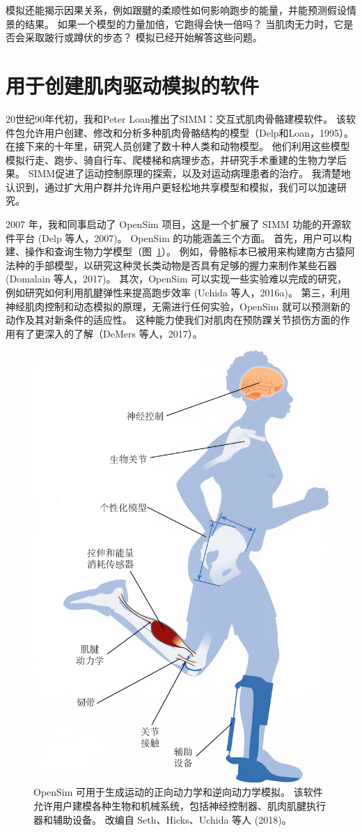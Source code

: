 模拟还能揭示因果关系，例如跟腱的柔顺性如何影响跑步的能量，并能预测假设情景的结果。
如果一个模型的力量加倍，它跑得会快一倍吗？
当肌肉无力时，它是否会采取跛行或蹲伏的步态？
模拟已经开始解答这些问题。



\section{用于创建肌肉驱动模拟的软件}

20世纪90年代初，我和Peter Loan推出了SIMM：交互式肌肉骨骼建模软件。
该软件包允许用户创建、修改和分析多种肌肉骨骼结构的模型（Delp和Loan，1995）。
在接下来的十年里，研究人员创建了数十种人类和动物模型。
他们利用这些模型模拟行走、跑步、骑自行车、爬楼梯和病理步态，并研究手术重建的生物力学后果。
SIMM促进了运动控制原理的探索，以及对运动病理患者的治疗。
我清楚地认识到，通过扩大用户群并允许用户更轻松地共享模型和模拟，我们可以加速研究。


2007 年，我和同事启动了 OpenSim 项目，这是一个扩展了 SIMM 功能的开源软件平台 (Delp 等人，2007)。
OpenSim 的功能涵盖三个方面。
首先，用户可以构建、操作和查询生物力学模型（图~\ref{fig:10_14}）。
例如，骨骼标本已被用来构建南方古猿阿法种的手部模型，以研究这种灵长类动物是否具有足够的握力来制作某些石器 (Domalain 等人，2017)。
其次，OpenSim 可以实现一些实验难以完成的研究，例如研究如何利用肌腱弹性来提高跑步效率 (Uchida 等人，2016a)。
第三，利用神经肌肉控制和动态模拟的原理，无需进行任何实验，OpenSim 就可以预测新的动作及其对新条件的适应性。
这种能力使我们对肌肉在预防踝关节损伤方面的作用有了更深入的了解（DeMers 等人，2017）。


\begin{figure}[!htb]
	\centering
	\includegraphics[width=0.7\linewidth]{chap10/10_14}
	\caption{OpenSim 可用于生成运动的正向动力学和逆向动力学模拟。
		该软件允许用户建模各种生物和机械系统，包括神经控制器、肌肉肌腱执行器和辅助设备。
		改编自 Seth、Hicks、Uchida 等人 (2018)。 \label{fig:10_14}}
\end{figure}


